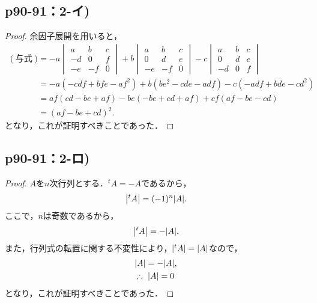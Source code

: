 \documentclass[uplatex,dvipdfmx,a4paper,11pt,fleqn]{jsarticle}
\begin{document}
\subsection*{p90-91：2-イ)}

\begin{tleftbar}
    \begin{proof}
    余因子展開を用いると，
    \begin{align*}
            (\text{与式}) & = -a \begin{vmatrix} a & b & c \\ -d & 0 &f \\ -e & -f & 0 \end{vmatrix} +b \begin{vmatrix} a & b & c \\ 0 & d & e \\ -e & -f & 0 \end{vmatrix} -c \begin{vmatrix} a & b & c \\ 0 & d & e \\ -d & 0 & f \end{vmatrix} \\
            & = -a (-cdf +bfe-af^2)+b(be^2-cde-adf)-c(-adf+bde-cd^2) \\
            & = af (cd-be+af) -be(-be+cd+af) +cf(af-be-cd) \\
            & = (af-be+cd)^2.
        \end{align*}
        となり，これが証明すべきことであった．
    \end{proof}
    \end{tleftbar}


\subsection*{p90-91：2-ロ)}

\begin{tleftbar}
    \begin{proof}
    $A$を$n$次行列とする．${}^t A = -A$であるから，
    \[
        \abs{{}^t A}=(-1)^n\abs{A}.
    \]
    ここで，$n$は奇数であるから，
    \[
        \abs{{}^t A}=-\abs{A}.
    \]
    また，行列式の転置に関する不変性により，$\abs{{}^t A}=\abs{A}$なので，
    \begin{align*} 
        & \abs{A}=-\abs{A} , \\
        & \therefore ~ \abs{A}=0
    \end{align*}
    となり，これが証明すべきことであった．
\end{proof}
\end{tleftbar}
\end{document}
